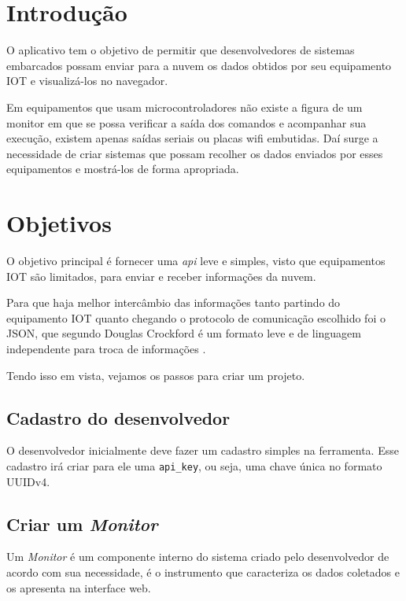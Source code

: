 \section{Introdução}\label{introduuxe7uxe3o}

O aplicativo \wm tem o objetivo de permitir que desenvolvedores de
sistemas embarcados possam enviar para a nuvem os dados obtidos por seu
equipamento IOT e visualizá-los no navegador.

Em equipamentos que usam microcontroladores não existe a figura de um
monitor em que se possa verificar a saída dos comandos e acompanhar sua
execução, existem apenas saídas seriais ou placas wifi embutidas. Daí
surge a necessidade de criar sistemas que possam recolher os dados
enviados por esses equipamentos e mostrá-los de forma apropriada.

\section{Objetivos}\label{objetivos}

O objetivo principal é fornecer uma \emph{api} leve e simples, visto que
equipamentos IOT são limitados, para enviar e receber informações da
nuvem.

Para que haja melhor intercâmbio das informações tanto partindo do
equipamento IOT quanto chegando o protocolo de comunicação escolhido foi
o JSON, que segundo Douglas Crockford é um formato leve e de linguagem
independente para troca de informações \cite{crockford-2015}.

Tendo isso em vista, vejamos os passos para criar um projeto.

\subsection{Cadastro do desenvolvedor}\label{cadastro-do-desenvolvedor}

O desenvolvedor inicialmente deve fazer um cadastro simples na
ferramenta. Esse cadastro irá criar para ele uma \texttt{api\_key}, ou
seja, uma chave única no formato UUIDv4.

\subsection{Criar um \emph{Monitor}}\label{criar-um-monitor}

Um \emph{Monitor} é um componente interno do sistema criado pelo
desenvolvedor de acordo com sua necessidade, é o instrumento que
caracteriza os dados coletados e os apresenta na interface web.

